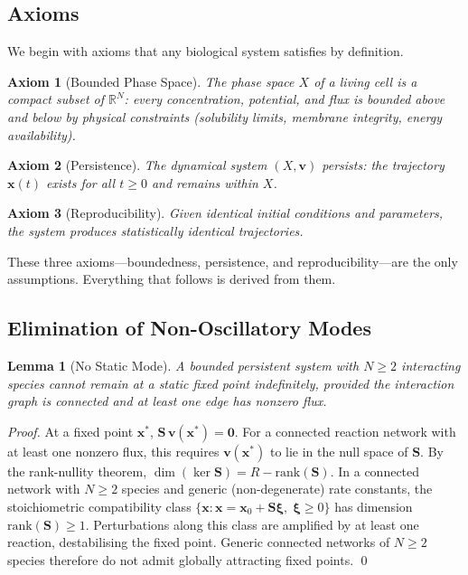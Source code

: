 \documentclass[11pt,twocolumn,a4paper]{article}
\newtheorem{lemma}[theorem]{Lemma}
\newtheorem{axiom}{Axiom}
\newcommand{\R}{\mathbb{R}}
\begin{document}
\subsection{Axioms}

We begin with axioms that any biological system satisfies by
definition.

\begin{axiom}[Bounded Phase Space]
\label{ax:bounded}
The phase space $X$ of a living cell is a compact subset of $\R^N$:
every concentration, potential, and flux is bounded above and below by
physical constraints (solubility limits, membrane integrity, energy
availability).
\end{axiom}

\begin{axiom}[Persistence]
\label{ax:persistence}
The dynamical system $(X, \mathbf{v})$ persists: the trajectory
$\mathbf{x}(t)$ exists for all $t \geq 0$ and remains within $X$.
\end{axiom}

\begin{axiom}[Reproducibility]
\label{ax:reproducibility}
Given identical initial conditions and parameters, the system produces
statistically identical trajectories.
\end{axiom}

These three axioms---boundedness, persistence, and
reproducibility---are the only assumptions.  Everything that follows
is derived from them.

\subsection{Elimination of Non-Oscillatory Modes}

\begin{lemma}[No Static Mode]
\label{lem:no-static}
A bounded persistent system with $N \geq 2$ interacting species cannot
remain at a static fixed point indefinitely, provided the interaction
graph is connected and at least one edge has nonzero flux.
\end{lemma}

\begin{proof}
At a fixed point $\mathbf{x}^*$, $\mathbf{S}\,\mathbf{v}(\mathbf{x}^*)
= \mathbf{0}$.  For a connected reaction network with at least one
nonzero flux, this requires $\mathbf{v}(\mathbf{x}^*)$ to lie in the
null space of $\mathbf{S}$.  By the rank-nullity theorem,
$\dim(\ker \mathbf{S}) = R - \mathrm{rank}(\mathbf{S})$.  In a
connected network with $N \geq 2$ species and generic (non-degenerate)
rate constants, the stoichiometric compatibility class
$\{\mathbf{x} : \mathbf{x} = \mathbf{x}_0 + \mathbf{S}\boldsymbol{\xi},\;
\boldsymbol{\xi} \geq 0\}$ has dimension
$\mathrm{rank}(\mathbf{S}) \geq 1$.  Perturbations along this class
are amplified by at least one reaction, destabilising the fixed point.
Generic connected networks of $N \geq 2$ species therefore do not
admit globally attracting fixed points.  \qed
\end{proof}
\end{document}
